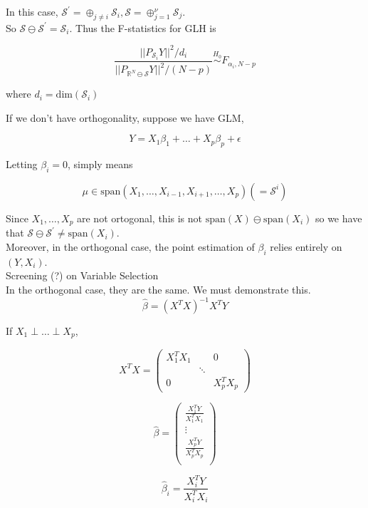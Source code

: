 \documentclass[11pt,fleqn]{book} %
\begin{document}
In this case,  $ \mathcal{S}^\prime = \oplus_{j \neq i} \mathcal{S}_i, \mathcal{S} = \oplus^\nu_{j = 1} \mathcal{S}_j$. \\

So $\mathcal{S} \ominus \mathcal{S}^\prime = \mathcal{S}_i.$ Thus the F-statistics for GLH is

		$$\frac{||P_{\mathcal{S}_i} Y ||^2/ d_i}{|| P_{\mathbb{R}^N \ominus \mathcal{S}} Y ||^2 / (N-p)}  \stackrel{H_0}{\sim} F_{\alpha_i, N-p}$$

where $d_i = \text{dim}(\mathcal{S}_i)$

If we don't have orthogonality, suppose we have GLM, 

		$$Y = X_1 \beta_1 + \dots + X_p \beta_p + \epsilon $$

Letting $\beta_i = 0$, simply means

		$$\mu \in \text{span}(X_1, \dots, X_{i-1}, X_{i + 1}, \dots, X_p ) (= \mathcal{S}^i) $$


Since $X_1, \dots, X_p$ are not ortogonal, this is not $\text{span}(X) \ominus \text{span}(X_i)$ so we have that $\mathcal{S} \ominus \mathcal{S}^\prime \neq \text{span}(X_i)$. \\

Moreover, in the orthogonal case, the point estimation of $\beta_i$ relies entirely on $(Y, X_i)$. \\

Screening (?) on Variable Selection\\

In the orthogonal case, they are the same. We must demonstrate this. \\

		$$\hat{\beta } = (X^T X)^{-1} X^T Y $$


If $X_1 \perp \dots \perp X_p$, 

		$$X^T X = \begin{pmatrix}
			X_1^T X_1 & & 0 \\
			 & \ddots &  \\
			 0 & & X_p^T X_p
		\end{pmatrix} $$

		$$\hat{\beta} = \begin{pmatrix}
			\frac{X_1^T Y}{X_1^T X_1}\\
			\vdots\\
			\frac{X_p^T Y}{X_p^T X_p}\\
		\end{pmatrix} $$

		$$\hat{\beta}_i = \frac{X_i^T Y}{X_i^T X_i} $$
\end{document}
